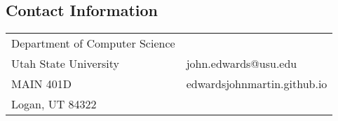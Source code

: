 \documentclass[margin,line]{res}
\begin{document}

\begin{resume}
\section{\sc Contact Information}
\vspace{.05in}


\begin{tabular}{@{}p{3.3in}p{3in}}
Department of Computer Science & \\%
Utah State University   & john.edwards@usu.edu \\
MAIN 401D      &  edwardsjohnmartin.github.io \\
Logan, UT 84322          &
\end{tabular}


\end{resume}
\end{document}
